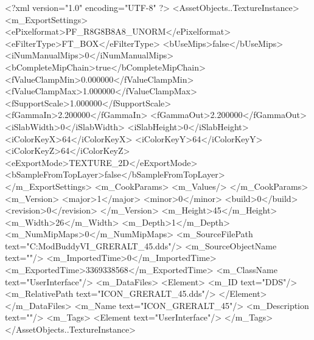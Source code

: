 <?xml version="1.0" encoding="UTF-8" ?>
<AssetObjects..TextureInstance>
	<m_ExportSettings>
		<ePixelformat>PF_R8G8B8A8_UNORM</ePixelformat>
		<eFilterType>FT_BOX</eFilterType>
		<bUseMips>false</bUseMips>
		<iNumManualMips>0</iNumManualMips>
		<bCompleteMipChain>true</bCompleteMipChain>
		<fValueClampMin>0.000000</fValueClampMin>
		<fValueClampMax>1.000000</fValueClampMax>
		<fSupportScale>1.000000</fSupportScale>
		<fGammaIn>2.200000</fGammaIn>
		<fGammaOut>2.200000</fGammaOut>
		<iSlabWidth>0</iSlabWidth>
		<iSlabHeight>0</iSlabHeight>
		<iColorKeyX>64</iColorKeyX>
		<iColorKeyY>64</iColorKeyY>
		<iColorKeyZ>64</iColorKeyZ>
		<eExportMode>TEXTURE_2D</eExportMode>
		<bSampleFromTopLayer>false</bSampleFromTopLayer>
	</m_ExportSettings>
	<m_CookParams>
		<m_Values/>
	</m_CookParams>
	<m_Version>
		<major>1</major>
		<minor>0</minor>
		<build>0</build>
		<revision>0</revision>
	</m_Version>
	<m_Height>45</m_Height>
	<m_Width>26</m_Width>
	<m_Depth>1</m_Depth>
	<m_NumMipMaps>0</m_NumMipMaps>
	<m_SourceFilePath text="C:\Users\asus\Documents\Firaxis ModBuddy\Civilization VI\temppic\ICON_GRERALT_45.dds"/>
	<m_SourceObjectName text=""/>
	<m_ImportedTime>0</m_ImportedTime>
	<m_ExportedTime>3369338568</m_ExportedTime>
	<m_ClassName text="UserInterface"/>
	<m_DataFiles>
		<Element>
			<m_ID text="DDS"/>
			<m_RelativePath text="ICON_GRERALT_45.dds"/>
		</Element>
	</m_DataFiles>
	<m_Name text="ICON_GRERALT_45"/>
	<m_Description text=""/>
	<m_Tags>
		<Element text="UserInterface"/>
	</m_Tags>
</AssetObjects..TextureInstance>

